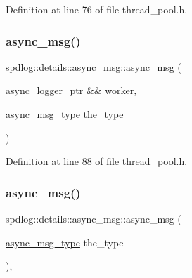 Definition at line 76 of file thread\+\_\+pool.\+h.

\mbox{\label{structspdlog_1_1details_1_1async__msg_ace5999e830cd28f7b14f804952925379}} 
\subsubsection{\texorpdfstring{async\+\_\+msg()}{async\_msg()}\hspace{0.1cm}{\footnotesize\ttfamily [5/6]}}
{\footnotesize\ttfamily spdlog\+::details\+::async\+\_\+msg\+::async\+\_\+msg (\begin{DoxyParamCaption}\item[{\hyperlink{namespacespdlog_1_1details_a9b6989c16b6150f7e4658ea2aee01bc2}{async\+\_\+logger\+\_\+ptr} \&\&}]{worker,  }\item[{\hyperlink{namespacespdlog_1_1details_a22274995cf879a5d0a08d1f7513ee4fb}{async\+\_\+msg\+\_\+type}}]{the\+\_\+type }\end{DoxyParamCaption})\hspace{0.3cm}{\ttfamily [inline]}}



Definition at line 88 of file thread\+\_\+pool.\+h.

\mbox{\label{structspdlog_1_1details_1_1async__msg_a466b9eb427b14c12f59afeeeb98c0e01}} 
\subsubsection{\texorpdfstring{async\+\_\+msg()}{async\_msg()}\hspace{0.1cm}{\footnotesize\ttfamily [6/6]}}
{\footnotesize\ttfamily spdlog\+::details\+::async\+\_\+msg\+::async\+\_\+msg (\begin{DoxyParamCaption}\item[{\hyperlink{namespacespdlog_1_1details_a22274995cf879a5d0a08d1f7513ee4fb}{async\+\_\+msg\+\_\+type}}]{the\+\_\+type }\end{DoxyParamCaption})\hspace{0.3cm}{\ttfamily [inline]}, {\ttfamily [explicit]}}



